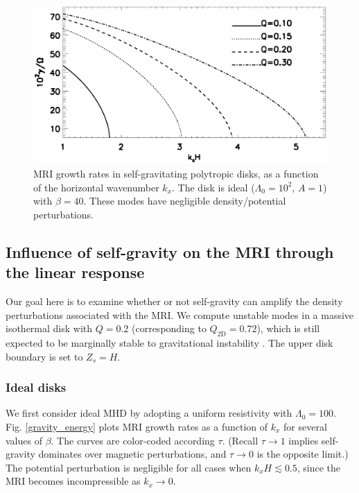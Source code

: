  
\begin{figure}
  \includegraphics[width=\linewidth]{figures/compare_growth_poly_varQ_kx}
  \caption{MRI growth rates in self-gravitating polytropic disks, as a
    function of the horizontal wavenumber $k_x$. The disk is ideal
    ($\Lambda_0=10^2,\, A=1$) with $\beta = 40$. These modes have negligible
    density/potential perturbations.  
    \label{compare_growth_poly_kx}}
\end{figure}



\subsection{Influence of self-gravity on the MRI through the linear
  response}  
Our goal here is to examine whether or not self-gravity can amplify
the density perturbations associated with the MRI. We compute unstable modes
in a massive isothermal disk with $Q=0.2$ (corresponding to
$Q_\mathrm{2D}=0.72$), which is still expected to be marginally  
stable to gravitational instability \citep[][who find
a critical value of  $Q\simeq 0.2$]{mamat10}.   
The upper disk boundary is set to $Z_s=H$. 


\subsubsection{Ideal disks}
We first consider ideal MHD by adopting a uniform 
resistivity with $\Lambda_0=100$.  
Fig. \ref{gravity_energy} plots MRI growth rates as a function of
$k_x$ for several values of $\beta$. The curves are color-coded 
according $\tau$. (Recall $\tau\to1$ implies self-gravity dominates
over magnetic perturbations, and $\tau\to0$ is the opposite limit.)  
The potential perturbation is negligible for all cases when
$k_xH\lesssim 0.5$, since the MRI becomes incompressible as $k_x\to
0$.  

